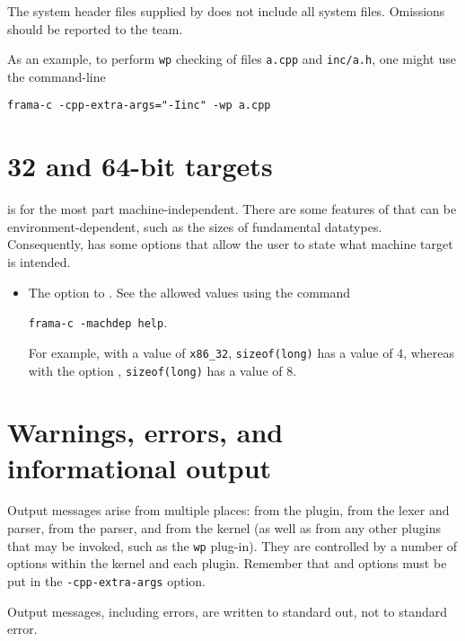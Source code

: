 The system header files supplied by \fcl does not include all \cpp system files. Omissions should be reported to the \fc team.

As an example, to perform \lstinline|wp| checking of files \lstinline|a.cpp| and \lstinline|inc/a.h|, one might use the command-line \\
\centerline{\texttt{frama-c -cpp-extra-args="-Iinc" -wp a.cpp}}

\section{32 and 64-bit targets}
\label{sec:bit}

\acslpp is for the most part machine-independent. 
There are some features of \cpp that can be environment-dependent, such as the sizes of fundamental datatypes. 
Consequently, \framac has some options that allow the user to state what machine target is intended. 

\begin{itemize}
\item The  option to \framac. See the allowed values using the command\\
\centerline{ \lstinline|frama-c -machdep help|.}
 For example, with a value of \lstinline|x86_32|, \lstinline|sizeof(long)| has a value of 4, whereas with the option , \lstinline|sizeof(long)| has a value of 8.

\end{itemize}


\section{Warnings, errors, and informational output}

Output messages arise from multiple places: from the \fcl plugin, from the \irg lexer and parser, from the \clang parser, and from the \framac kernel (as well as from any other plugins that may be invoked, such as the \texttt{wp} plug-in). 
They are controlled by a number of options within the \framac kernel and each plugin. Remember that \cl and \irg options must be put in the \lstinline|-cpp-extra-args| option.

Output messages, including errors, are written to standard out, not to standard error. 

